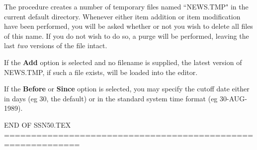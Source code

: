 The procedure creates  a number of temporary files named ``NEWS.TMP" in the
current default directory.
Whenever either item addition or item modification have been performed, you will
be asked whether or not you wish to delete all files of this name.
If you do not wish to do so, a purge will be performed, leaving the last
{\em two} versions of the file intact.

If the {\bf Add} option is selected and no filename is supplied, the latest
version of NEWS.TMP, if such a file exists, will be loaded into the editor.

If the {\bf Before} or {\bf Since} option is selected, you may specify the
cutoff date either in days (eg 30, the default) or in the standard system
time format (eg 30-AUG-1989).


END OF SSN50.TEX ============================================================
